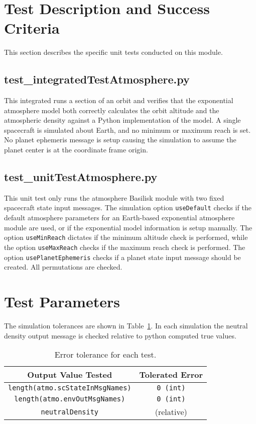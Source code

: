 
\section{Test Description and Success Criteria}
This section describes the specific unit tests conducted on this module.


\subsection{test\_integratedTestAtmosphere.py}
This integrated runs a section of an orbit and verifies that the exponential atmosphere model both correctly calculates the orbit altitude and the atmospheric density against a Python implementation of the model.   A single spacecraft is simulated about Earth, and no minimum or maximum reach is set.  No planet ephemeris message is setup causing the simulation to assume the planet center is at the coordinate frame origin.

\subsection{test\_unitTestAtmosphere.py}
This unit test only runs the atmosphere Basilisk module with two fixed spacecraft state input messages.  The simulation option {\tt useDefault} checks if the default atmosphere parameters for an Earth-based exponential atmosphere module are used, or if the exponential model information is setup manually.  The option {\tt useMinReach} dictates if the minimum altitude check is performed, while the option {\tt useMaxReach} checks if the maximum reach check is performed.  The option {\tt usePlanetEphemeris} checks if a planet state input message should be created.  All permutations are checked.

\section{Test Parameters}
The simulation tolerances are shown in Table~\ref{tab:errortol}.  In each simulation the neutral density output message is checked relative to python computed true values.  
\begin{table}[htbp]
	\caption{Error tolerance for each test.}
	\label{tab:errortol}
	\centering \fontsize{10}{10}\selectfont
	\begin{tabular}{ c | c } %
		\hline\hline
		\textbf{Output Value Tested}  & \textbf{Tolerated Error}  \\ 
		\hline
		{\tt length(atmo.scStateInMsgNames)}        & {\tt 0 (int)}   \\
		{\tt length(atmo.envOutMsgNames)}        & {\tt 0 (int)}   \\ 
		{\tt neutralDensity}        &  (relative) \\ 
		\hline\hline
	\end{tabular}
\end{table}




